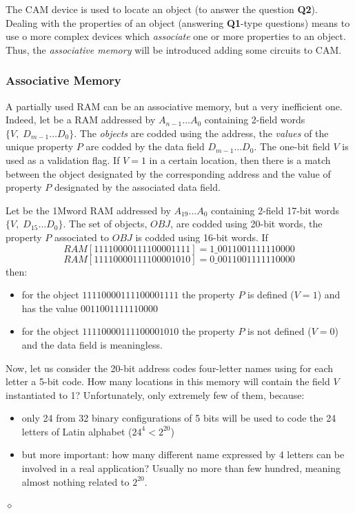 The CAM device is used to locate an object (to answer the question
{\bf Q2}). Dealing with the properties of an object (answering
{\bf Q1}-type questions) means to use o more complex devices which
{\em associate} one or more properties to an object. Thus, the
{\em associative memory} will be introduced adding some circuits
to CAM.


\subsubsection{Associative Memory}

A partially used RAM can be an associative memory, but a very
inefficient one. Indeed, let be a RAM addressed by $A_{n-1} \ldots
A_{0}$ containing 2-field words $\{V, \; D_{m-1} \ldots D_{0}\}$.
The {\em objects} are codded using the address, the {\em values}
of the unique property $P$ are codded by the data field $D_{m-1}
\ldots D_{0}$. The one-bit field $V$ is used as a validation flag.
If $V=1$ in a certain location, then there is a match between the
object designated by the corresponding address and the value of
property $P$ designated by the associated data field.

\begin{exemplu}
Let be the 1Mword RAM addressed by $A_{19} \ldots A_{0}$
containing 2-field 17-bit words $\{V, \; D_{15} \ldots D_{0}\}$.
The set of objects, $OBJ$, are codded using 20-bit words, the
property $P$ associated to $OBJ$ is codded using 16-bit words. If
$$RAM[11110000111100001111] = 1\_0011001111110000$$
$$RAM[11110000111100001010] = 0\_0011001111110000$$
then:
\begin{itemize}
    \item for the object $11110000111100001111$ the property $P$
    is defined ($V=1$) and has the value $0011001111110000$
    \item for the object $11110000111100001010$ the property $P$
    is not defined ($V=0$) and the data field is meaningless.
\end{itemize}
Now, let us consider the 20-bit address codes four-letter names
using for each letter a 5-bit code. How many locations in this
memory will contain the field $V$ instantiated to 1?
Unfortunately, only extremely few of them, because:
\begin{itemize}
    \item only 24 from 32 binary configurations of 5 bits will be
    used to code the 24 letters of Latin alphabet ($24^{4} <
    2^{20}$)
    \item but more important: how many different name expressed by 4
    letters can be involved in a real application? Usually no more
    than few hundred, meaning almost nothing related to $2^{20}$.
\end{itemize}
 $\diamond$
\end{exemplu}

